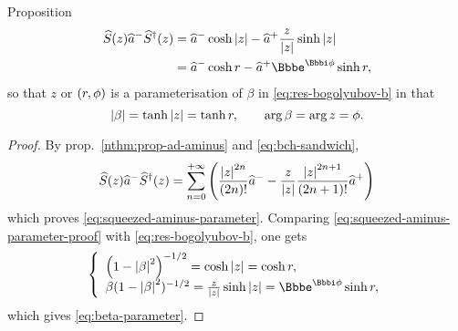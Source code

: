\begin{namedthm}{Proposition}
\begin{align}
	\rfun{\widehat{S}}{z} \widehat{a}^- \rfun{\widehat{S}^\dagger}{z}
	&= \widehat{a}^-\cosh \vbr{z}
		- \widehat{a}^+ \frac{z}{\vbr{z}} \sinh \vbr{z}
	\nonumber \\
	&= \widehat{a}^-\cosh r - \widehat{a}^+ \ee^{\ii\phi} \sinh r,
	\label{eq:squeezed-aminus-parameter}
\end{align}
so that $z$ or ${\left(r, \phi\right)}$ is a parameterisation of $\beta$ in 
\cref{eq:res-bogolyubov-b} in that
\begin{equation}
	{\left|\beta\right|} = \tanh{\left|z\right|} = \tanh r,\qquad \arg \beta = \arg z = \phi.
	\label{eq:beta-parameter}
\end{equation}
\end{namedthm} %
\begin{proof}
	By prop.~\ref{nthm:prop-ad-aminus} and \cref{eq:bch-sandwich},
	\begin{equation} %
		\rfun{\widehat{S}}{z} \widehat{a}^- \rfun{\widehat{S}^\dagger}{z}
		= \sum_{n=0}^{+\infty}\rbr{
			\frac{\vbr{z}^{2n}}{\rbr{2n}!} \widehat{a}^-
- \frac{z}{\vbr{z}}\frac{\vbr{z}^{2n+1}}{\rbr{2n+1}!}\widehat{a}^+}
		\label{eq:squeezed-aminus-parameter-proof}
	\end{equation} %
	which proves \cref{eq:squeezed-aminus-parameter}. Comparing 
	\cref{eq:squeezed-aminus-parameter-proof} with \cref{eq:res-bogolyubov-b}, 
	one gets
	\begin{equation}
		\left\{\begin{array}{l}
			\rbr{1-\vbr{\beta}^2}^{-1/2} = \cosh \vbr{z} = \cosh r, \\
			\beta (1-\vbr{\beta}^2)^{-1/2}
			= \frac{z}{\vbr{z}}\sinh \vbr{z} = \ee^{\ii\phi}\sinh r,
		\end{array}\right.
	\end{equation}
	which gives \cref{eq:beta-parameter}.
\end{proof}


